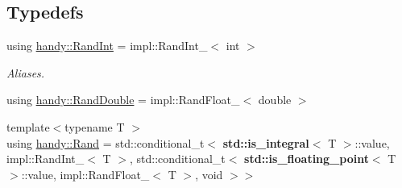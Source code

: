 \subsection*{Typedefs}
\begin{DoxyCompactItemize}
\item 
using \hyperlink{group__RandomGroup_gafccf8f163a45086036ca7b3bec3413f5}{handy\+::\+Rand\+Int} = impl\+::\+Rand\+Int\+\_\+$<$ int $>$
\begin{DoxyCompactList}\small\item\em Aliases. \end{DoxyCompactList}\item 
using \hyperlink{group__RandomGroup_gace607d3788e863aab630c29521cdcf3d}{handy\+::\+Rand\+Double} = impl\+::\+Rand\+Float\+\_\+$<$ double $>$
\item 
{\footnotesize template$<$typename T $>$ }\\using \hyperlink{group__RandomGroup_gaa56330e62ab8c2abe507a74d49b70969}{handy\+::\+Rand} = std\+::conditional\+\_\+t$<$ {\bf std\+::is\+\_\+integral}$<$ T $>$\+::value, impl\+::\+Rand\+Int\+\_\+$<$ T $>$, std\+::conditional\+\_\+t$<$ {\bf std\+::is\+\_\+floating\+\_\+point}$<$ T $>$\+::value, impl\+::\+Rand\+Float\+\_\+$<$ T $>$, void $>$$>$
\end{DoxyCompactItemize}
